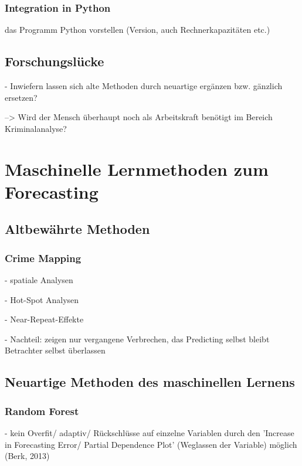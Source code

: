 \documentclass[a4paper,12pt,parskip,bibtotoc,liststotoc]{article}
\begin{document}
\subsubsection{Integration in Python}

das Programm Python vorstellen (Version, auch Rechnerkapazitäten etc.)


\subsection{Forschungslücke} 

- Inwiefern lassen sich alte Methoden durch neuartige ergänzen bzw. gänzlich ersetzen?

--> Wird der Mensch überhaupt noch als Arbeitskraft benötigt im Bereich Kriminalanalyse?





\newpage
\section{Maschinelle Lernmethoden zum Forecasting}

\subsection{Altbewährte Methoden}

\subsubsection{Crime Mapping}

- spatiale Analysen

- Hot-Spot Analysen

- Near-Repeat-Effekte

- Nachteil: zeigen nur vergangene Verbrechen, das Predicting selbst bleibt Betrachter selbst überlassen

\subsection{Neuartige Methoden des maschinellen Lernens}

\subsubsection{Random Forest}  

- kein Overfit/ adaptiv/ Rückschlüsse auf einzelne Variablen durch den 'Increase in Forecasting Error/ Partial Dependence Plot' (Weglassen der Variable) möglich (Berk, 2013) 
\end{document}
